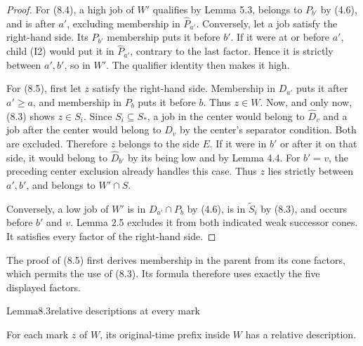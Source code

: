 \begin{proof}
For (8.4), a high job of \(W'\) qualifies by Lemma 5.3, belongs to \(P_{b'}\) by (4.6), and is after \(a'\), excluding membership in \(\widehat P_{a'}\). Conversely, let a job satisfy the right-hand side. Its \(P_{b'}\) membership puts it before \(b'\). If it were at or before \(a'\), child (I2) would put it in \(\widehat P_{a'}\), contrary to the last factor. Hence it is strictly between \(a',b'\), so in \(W'\). The qualifier identity then makes it high.

For (8.5), first let \(z\) satisfy the right-hand side. Membership in \(D_{a'}\) puts it after \(a'\geq a\), and membership in \(P_b\) puts it before \(b\). Thus \(z\in W\). Now, and only now, (8.3) shows \(z\in S_i\). Since \(S_i\subseteq S_*\), a job in the center would belong to \(\widehat D_v\) and a job after the center would belong to \(D_v\) by the center's separator condition. Both are excluded. Therefore \(z\) belongs to the side \(E\). If it were in \(b'\) or after it on that side, it would belong to \(\widehat D_{b'}\) by its being low and by Lemma 4.4. For \(b'=v\), the preceding center exclusion already handles this case. Thus \(z\) lies strictly between \(a',b'\), and belongs to \(W'\cap S\).

Conversely, a low job of \(W'\) is in \(D_{a'}\cap P_b\) by (4.6), is in \(\widetilde S_i\) by (8.3), and occurs before \(b'\) and \(v\). Lemma 2.5 excludes it from both indicated weak successor cones. It satisfies every factor of the right-hand side.
\end{proof}

The proof of (8.5) first derives membership in the parent from its cone factors, which permits the use of (8.3). Its formula therefore uses exactly the five displayed factors.

\begin{numbered}{Lemma}{8.3}{relative descriptions at every mark}

For each mark \(z\) of \(W\), its original-time prefix inside \(W\) has a relative description.

\end{numbered}

